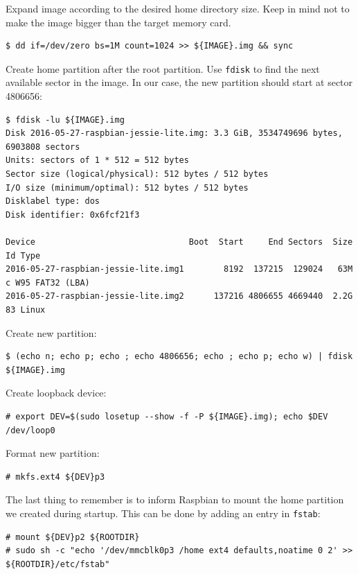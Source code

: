 Expand image according to the desired home directory size. Keep in mind not
to make the image bigger than the target memory card.
\begin{lstlisting}[]
$ dd if=/dev/zero bs=1M count=1024 >> ${IMAGE}.img && sync
\end{lstlisting}
\FloatBarrier
\vspace{-5mm}

Create home partition after the root partition. Use \texttt{fdisk} to
find the next available sector in the image. In our case, the new
partition should start at sector 4806656:
\begin{lstlisting}[]
$ fdisk -lu ${IMAGE}.img
Disk 2016-05-27-raspbian-jessie-lite.img: 3.3 GiB, 3534749696 bytes, 6903808 sectors
Units: sectors of 1 * 512 = 512 bytes
Sector size (logical/physical): 512 bytes / 512 bytes
I/O size (minimum/optimal): 512 bytes / 512 bytes
Disklabel type: dos
Disk identifier: 0x6fcf21f3

Device                               Boot  Start     End Sectors  Size Id Type
2016-05-27-raspbian-jessie-lite.img1        8192  137215  129024   63M  c W95 FAT32 (LBA)
2016-05-27-raspbian-jessie-lite.img2      137216 4806655 4669440  2.2G 83 Linux
\end{lstlisting}
\FloatBarrier
\vspace{-5mm}

Create new partition:

\begin{lstlisting}[]
$ (echo n; echo p; echo ; echo 4806656; echo ; echo p; echo w) | fdisk ${IMAGE}.img
\end{lstlisting}
\FloatBarrier
\vspace{-5mm}

Create loopback device: 
\begin{lstlisting}[]
# export DEV=$(sudo losetup --show -f -P ${IMAGE}.img); echo $DEV
/dev/loop0
\end{lstlisting}
\FloatBarrier
\vspace{-5mm}

Format new partition:
\begin{lstlisting}[]
# mkfs.ext4 ${DEV}p3
\end{lstlisting}
\FloatBarrier
\vspace{-5mm}

The last thing to remember is to inform Raspbian to mount the home partition
we created during startup. This can be done by adding an entry in \texttt{fstab}:
\begin{lstlisting}[]
# mount ${DEV}p2 ${ROOTDIR}
# sudo sh -c "echo '/dev/mmcblk0p3 /home ext4 defaults,noatime 0 2' >> ${ROOTDIR}/etc/fstab"
\end{lstlisting}
\FloatBarrier
\vspace{-5mm}

